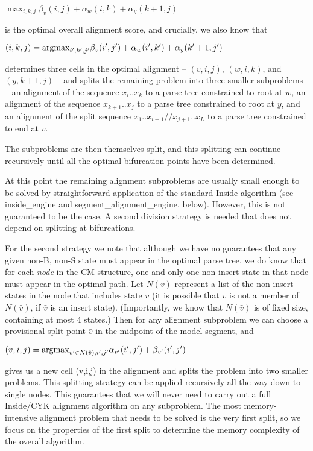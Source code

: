 \documentclass[11pt]{article}
\begin{document}
      $\max_{i,k,j} \beta_{v}(i,j) + \alpha_{w}(i,k) + \alpha_{y}(k+1,j)$

is the optimal overall alignment score, and crucially, we also know
that

      $(i,k,j) = \mbox{\rm{argmax}}_{i',k',j'}  \beta_{v}(i',j') +  \alpha_{w}(i',k') + \alpha_{y}(k'+1,j') $

determines three cells in the optimal alignment -- $(v,i,j)$,
$(w,i,k)$, and $(y,k+1,j)$ -- and splits the remaining problem into
three smaller subproblems -- an alignment of the sequence
$x_{i}..x_{k}$ to a parse tree constrained to root at $w$, an
alignment of the sequence $x_{k+1}..x_{j}$ to a parse tree constrained
to root at $y$, and an alignment of the split sequence
$x_1..x_{i-1}//x_{j+1}..x_L$ to a parse tree constrained to end at
$v$.

The subproblems are then themselves split, and this splitting can
continue recursively until all the optimal bifurcation points have
been determined.

At this point the remaining alignment subproblems are usually small
enough to be solved by straightforward application of the standard
Inside algorithm (see inside\_engine and segment\_alignment\_engine,
below). However, this is not guaranteed to be the case. A second
division strategy is needed that does not depend on splitting at
bifurcations.

For the second strategy we note that although we have no guarantees
that any given non-B, non-S state must appear in the optimal parse
tree, we do know that for each \emph{node} in the CM structure, one
and only one non-insert state in that node must appear in the optimal
path. Let $N(\bar{v})$ represent a list of the non-insert states in
the node that includes state $\bar{v}$ (it is possible that $\bar{v}$
is not a member of $N(\bar{v})$, if $\bar{v}$ is an insert
state). (Importantly, we know that $N(\bar{v})$ is of fixed size,
containing at most 4 states.) Then for any alignment subproblem we can
choose a provisional split point $\bar{v}$ in the midpoint of the
model segment, and

$(v,i,j) = \mbox{\rm{argmax}}_{v' \in N(\hat{v}),i',j'} \alpha_{v'}(i',j') + \beta_{v'}(i',j')$

gives us a new cell (v,i,j) in the alignment and splits the problem
into two smaller problems. This splitting strategy can be applied
recursively all the way down to single nodes. This guarantees that we
will never need to carry out a full Inside/CYK alignment algorithm on
any subproblem. The most memory-intensive alignment problem that needs
to be solved is the very first split, so we focus on the properties of
the first split to determine the memory complexity of the overall
algorithm.
\end{document}
